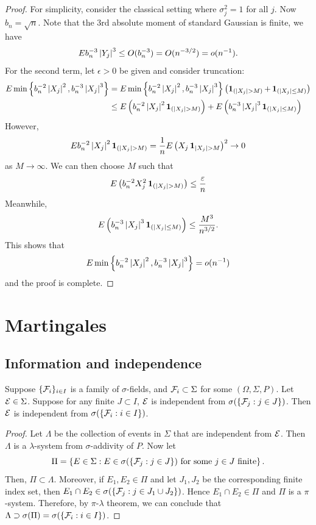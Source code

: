 \documentclass[a4paper]{article}
\begin{document}
\begin{proof}
  For simplicity, consider the classical setting where $\sigma_j^2 = 1$ 
  for all $j$. Now $b_n = \sqrt{n}$. Note that the 3rd absolute moment 
  of standard Gaussian is finite, we have 
  \[
  E
    b_n^{-3} \left\lvert Y_j\right\rvert^3 
  \leq O(b_n^{-3}) = O(n^{-3/2}) = o(n^{-1}).
  \]
  For the second term, let $\epsilon > 0$ be given and consider truncation:
  \begin{align*}
    E \min \left\{ b_n^{-2} \left\lvert X_j\right\rvert^2, b_n^{-3} \left\lvert X_j\right\rvert^{3} \right\}
    &= E \min \left\{ b_n^{-2} \left\lvert X_j\right\rvert^2, b_n^{-3} \left\lvert X_j\right\rvert^{3} \right\} 
    \left( \operatorname{\mathbf{1}}_{(\left\lvert X_j\right\rvert > M)} + \operatorname{\mathbf{1}}_{(\left\lvert X_j\right\rvert \leq M)} \right) \\
    &\leq E \left( b_n^{-2} \left\lvert X_j\right\rvert^2 \operatorname{\mathbf{1}}_{(\left\lvert X_j\right\rvert > M)} \right) 
    + E \left( b_n^{-3} \left\lvert X_j\right\rvert^3 \operatorname{\mathbf{1}}_{(\left\lvert X_j\right\rvert \leq M)} \right)
  \end{align*}
  However, 
  \[
  E b_n^{-2} \left\lvert X_j\right\rvert^2 \operatorname{\mathbf{1}}_{(\left\lvert X_j\right\rvert > M)}
  = \frac{1}{n} E \left( X_j \operatorname{\mathbf{1}}_{\left\lvert X_j\right\rvert > M} \right)^2 \to 0
  \]
  as $M \to \infty$. We can then choose $M$ such that 
  \[
  E \left( b_n^{-2} X_j^2 \operatorname{\mathbf{1}}_{(\left\lvert X_j\right\rvert > M)} \right) \leq \frac{\varepsilon}{n}
  \]
  Meanwhile, 
  \[
  E \left( b_n^{-3} \left\lvert X_j\right\rvert^3 \operatorname{\mathbf{1}}_{(\left\lvert X_j\right\rvert \leq M)} \right)
  \leq \frac{M^3}{n^{3/2}}.
  \]
  This shows that 
  \[
  E \min \left\{ b_n^{-2} \left\lvert X_j\right\rvert^2, b_n^{-3} \left\lvert X_j\right\rvert^{3} \right\} 
  = o(n^{-1})
  \]
  and the proof is complete.
\end{proof}

\section{Martingales}

\subsection{Information and independence}

\begin{prop}
  Suppose $\{\mathcal{F}_i\}_{i \in I}$ is a family of $\sigma$-fields, 
  and $\mathcal{F}_i \subset \Sigma$ for some $(\Omega, \Sigma, P)$. 
  Let $\mathcal{E} \in \Sigma$. Suppose 
  for any finite $J \subset I$, $\mathcal{E}$ is independent from 
  $\sigma (\{\mathcal{F}_j : j \in J\})$. Then $\mathcal{E}$ is independent from 
  $\sigma (\{\mathcal{F}_i: i \in I\})$.
\end{prop}

\begin{proof}
  Let $\Lambda$ be the collection of events in $\Sigma$ that are independent
  from $\mathcal{E}$. Then $\Lambda$ is a $\lambda$-system from $\sigma$-addivity
  of $P$. Now let 
  \[
  \Pi = \left\{ E \in \Sigma : E \in \sigma (\{ \mathcal{F}_j : j \in J \}) 
  \text{ for some $j \in J$ finite} \right\}.
  \]
  Then, $\Pi \subset \Lambda$. Moreover, if $E_1, E_2 \in \Pi$
  and let $J_1, J_2$ be the corresponding finite index set, then 
  $E_1 \cap E_2 \in \sigma (\{ \mathcal{F}_j : j \in J_1 \cup J_2 \})$.
  Hence $E_1 \cap E_2 \in \Pi$ and $\Pi$ is a $\pi$-system.
  Therefore, by $\pi$-$\lambda$ theorem, we can conclude that 
  $\Lambda \supset \sigma (\Pi) = \sigma (\{ \mathcal{F}_i : i \in I \})$.

\end{proof}
\end{document}
